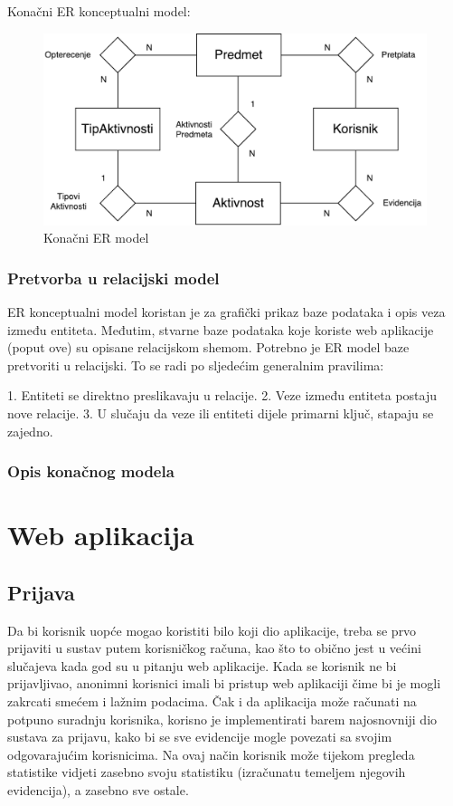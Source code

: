 \documentclass[times, utf8, zavrsni]{fer}
\begin{document}
Konačni ER konceptualni model:

\begin{figure}[H]
\centering
\includegraphics[width=\textwidth,height=\textheight,keepaspectratio]{img/er-model.pdf}
\caption{Konačni ER model}
\label{fig:er-model}
\end{figure}

\subsection{Pretvorba u relacijski model}
ER konceptualni model koristan je za grafički prikaz baze podataka i opis veza između entiteta. Međutim, stvarne baze podataka koje koriste web aplikacije (poput ove) su opisane relacijskom shemom. Potrebno je ER model baze pretvoriti u relacijski. To se radi po sljedećim generalnim pravilima:

1. Entiteti se direktno preslikavaju u relacije.
2. Veze između entiteta postaju nove relacije.
3. U slučaju da veze ili entiteti dijele primarni ključ, stapaju se zajedno.

\subsection{Opis konačnog modela}


\chapter{Web aplikacija}

\section{Prijava}
Da bi korisnik uopće mogao koristiti bilo koji dio aplikacije, treba se prvo prijaviti u sustav putem korisničkog računa, kao što to obično jest u većini slučajeva kada god su u pitanju web aplikacije. Kada se korisnik ne bi prijavljivao, anonimni korisnici imali bi pristup web aplikaciji čime bi je mogli zakrcati smećem i lažnim podacima. Čak i da aplikacija može računati na potpuno suradnju korisnika, korisno je implementirati barem najosnovniji dio sustava za prijavu, kako bi se sve evidencije mogle povezati sa svojim odgovarajućim korisnicima. Na ovaj način korisnik može tijekom pregleda statistike vidjeti zasebno svoju statistiku (izračunatu temeljem njegovih evidencija), a zasebno sve ostale.
\end{document}
